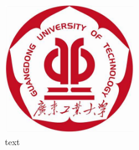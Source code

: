 \begin{figure}[h]
    \centering
    \includegraphics[width=0.5\textwidth]{figures/logo.png}
    \caption{text}
\end{figure}

